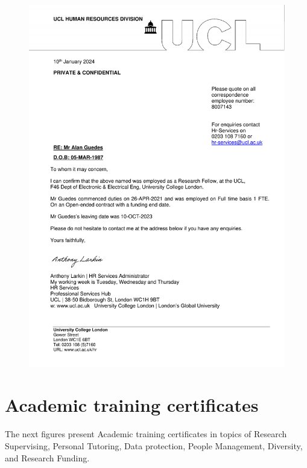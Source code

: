 \documentclass[10pt,a4paper,sans,colorlinks]{moderncv}
\begin{document}
\begin{figure}
    \centering
    \includegraphics[align=t,width=\textwidth,height=0.6\paperheight, keepaspectratio=true]{certificates/postdoc-ucl-2021-certificate.pdf}
\end{figure}

\section{Academic training certificates}
The next figures present Academic training certificates in topics of Research Supervising, Personal Tutoring, Data protection, People Management, Diversity, and Research Funding.
\end{document}
